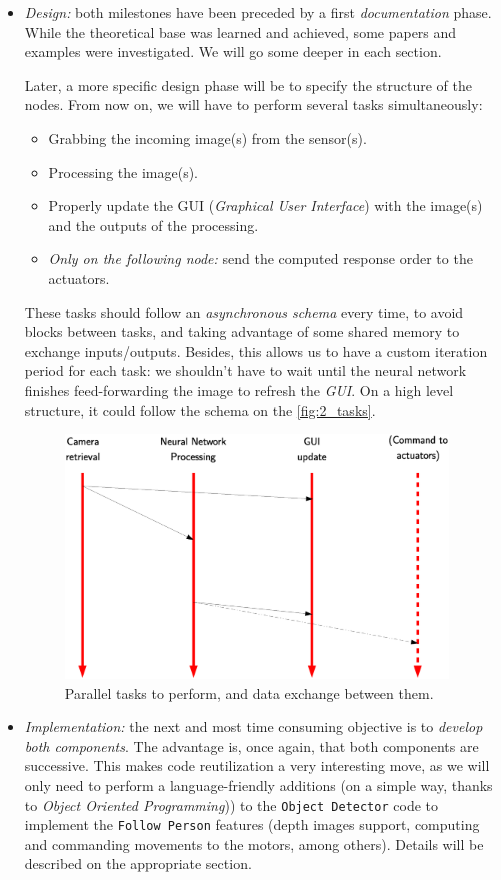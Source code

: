 \begin{itemize}
	\item \textit{Design:} both milestones have been preceded by a first \textit{documentation} phase. While the theoretical base was learned and achieved, some papers and examples were investigated. We will go some deeper in each section.
	
	Later, a more specific design phase will be to specify the structure of the nodes.
	From now on, we will have to perform several tasks simultaneously:
	\begin{itemize}
		\item Grabbing the incoming image(s) from the sensor(s).
		\item Processing the image(s).
		\item Properly update the GUI (\textit{Graphical User Interface}) with the image(s) and the outputs of the processing.
		\item \textit{Only on the following node:} send the computed response order to the actuators.
	\end{itemize}
	These tasks should follow an \emph{asynchronous schema} every time, to avoid blocks between tasks, and taking advantage of some shared memory to exchange inputs/outputs. Besides, this allows us to have a custom iteration period for each task: we shouldn't have to wait until the neural network finishes feed-forwarding the image to refresh the \emph{GUI}. On a high level structure, it could follow the schema on the \autoref{fig:2_tasks}.
	
	\begin{figure}[h]
		\centering
		\includegraphics[width=4in]{images/tasks_threads}
		\caption{Parallel tasks to perform, and data exchange between them.}
		\label{fig:2_tasks}
	\end{figure}
	
	\item \textit{Implementation:} the next and most time consuming objective is to \textit{develop both components}. The advantage is, once again, that both components are successive. This makes code reutilization a very interesting move, as we will only need to perform a language-friendly additions (on a simple way, thanks to \textit{Object Oriented Programming})) to the \texttt{Object Detector} code to implement the \texttt{Follow Person} features (depth images support, computing and commanding movements to the motors, among others). Details will be described on the appropriate section.
	

\end{itemize}
